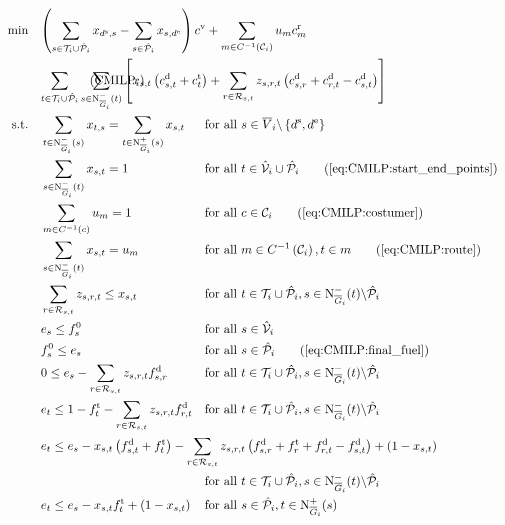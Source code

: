 \begin{align}
	\min \quad & \omit\rlap{$\displaystyle{\left(\sum_{s\in\Ti\cup\Phat_i} x_{\ds,s} - \sum_{s\in\Phat_i} x_{s,\de}\right)\cv + \sum_{m\in C^{-1}\left(\mathcal{C}_i\right)} u_m \croute_m}$} \nonumber \\
	& \omit\rlap{$\displaystyle{\sum_{t\in\Ti\cup\Phat_i}\sum_{s\in\Ninoi(t)}\left[x_{s,t}\left(\cd_{s,t}+\ct_t\right)+\sum_{r\in\Rst}z_{s,r,t}\left(\cd_{s,r}+\cd_{r,t}-\cd_{s,t}\right)\right]}$} \tag{$\operatorname{CMILP}_i$} \label{eq:CMILPi} \\
	\text{s.t.} \quad & \sum_{t\in\Ninoi(s)} x_{t,s} = \sum_{t\in\Noutoi(s)} x_{s,t} & & \text{for all } s\in \overline{V}_i\backslash\left\{\ds,\de\right\} \label{eq:CMILP:flow} \\
	& \sum_{s\in\Ninoi(t)} x_{s,t} = 1 && \text{for all } t\in\Vhat_i\cup\Phat_i \tag{\ref{eq:CMILP:start_end_points}} \\
	& \sum_{m\in C^{-1}(c)} u_m = 1 && \text{for all } c\in\mathcal{C}_i \tag{\ref{eq:CMILP:costumer}} \\
	& \sum_{s\in\Ninoi(t)} x_{s,t} = u_m && \text{for all } m\in C^{-1}\left(\mathcal{C}_i\right), t\in m \tag{\ref{eq:CMILP:route}} \\
	& \sum_{r\in\Rst} z_{s,r,t} \leq x_{s,t} && \text{for all } t\in\Ti\cup\Phat_i, s\in\Ninoi(t)\backslash\Phat_i \label{eq:CMILP:refuel} \\
	& e_s \leq f_s^0 & & \text{for all } s\in\Vhat_i \label{eq:CMILP:initial_fuel} \\
	& f^0_s \leq e_s && \text{for all } s\in\Phat_i \tag{\ref{eq:CMILP:final_fuel}} \\
	& 0 \leq e_s - \sum_{r\in\Rst} z_{s,r,t}\fd_{s,r} & & \text{for all } t\in\Ti\cup\Phat_i, s\in\Ninoi(t)\backslash\Phat_i \label{eq:CMILP:min_fuel} \\
	& e_t \leq 1 - \ft_t - \sum_{r\in\Rst} z_{s,r,t}\fd_{r,t} & & \text{for all } t\in\Ti\cup\Phat_i, s\in\Ninoi(t)\backslash\Phat_i \label{eq:CMILP:max_fuel} \\
	& \omit\rlap{$\displaystyle{e_t \leq e_s - x_{s,t}\left(f_{s,t}^{\operatorname{d}}+f_t^{\operatorname{t}}\right) - \sum_{r\in\Rst} z_{s,r,t}\left(\fd_{s,r}+\ft_r+\fd_{r,t}-\fd_{s,t}\right) + \left(1-x_{s,t}\right)}$} \nonumber \\
	& & & \text{for all } t\in\Ti\cup\Phat_i, s\in\Ninoi(t)\backslash\Phat_i \label{eq:CMILP:fuel_consumption} \\
	& e_t \leq e_s-x_{s,t}\ft_t+\left(1-x_{s,t}\right) && \text{for all } s\in\Phat_i,t\in\Noutoi(s) \label{eq:CMILP:fuel_splitpoint} \\

\end{align}
